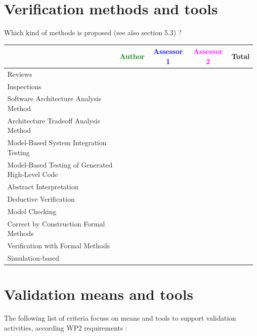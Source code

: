 \section{Verification methods and tools}

Which kind of methods is proposed (see also \citep{D4.1} section 5.3) ?



\begin{tabular}{|l | c | c | c | c|}
\hline
& \textcolor{green}{Author} & \textcolor{blue}{Assessor 1} & \textcolor{magenta}{Assessor 2} & Total \\
\hline 
Reviews & & & &  \\
\hline
Inspections & & & &  \\
\hline
Software Architecture Analysis Method & & & &  \\
\hline
Architecture Tradeoff Analysis Method & & & &  \\
\hline
Model-Based System Integration Testing & & & &  \\
\hline
Model-Based Testing of Generated High-Level Code & & & &  \\
\hline
Abstract Interpretation & & & &  \\
\hline
Deductive Verification & & & &  \\
\hline
Model Checking & & & &  \\
\hline
Correct by Construction Formal Methods & & & &  \\
\hline
Verification with Formal Methods & & & &  \\
\hline
Simulation-based & & & &  \\
\hline
\end{tabular}

\section{Validation means and tools}

The following list of criteria focuss on means and tools to support validation activities, according WP2  requirements :

